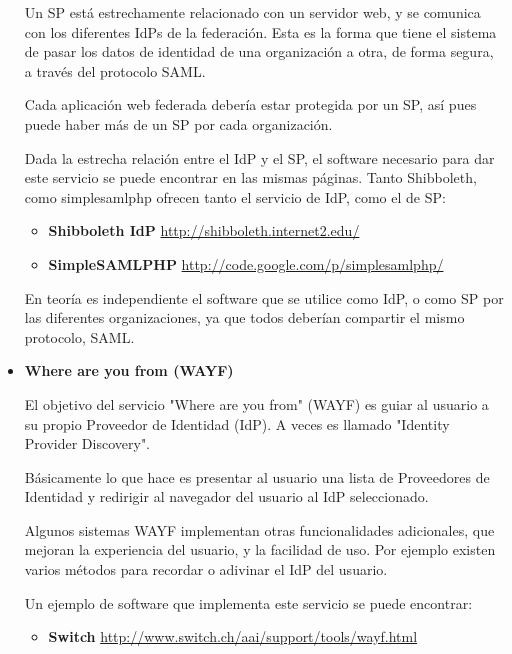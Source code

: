 \begin{itemize}
    Un SP está estrechamente relacionado con un servidor web, y se
    comunica con los diferentes IdPs de la federación. Esta es la
    forma que tiene el sistema de pasar los datos de identidad de una
    organización a otra, de forma segura, a través del protocolo SAML.

    Cada aplicación web federada debería estar protegida por un SP,
    así pues puede haber más de un SP por cada organización.

    Dada la estrecha relación entre el IdP y el SP, el software
    necesario para dar este servicio se puede encontrar en las mismas
    páginas. Tanto Shibboleth, como simplesamlphp ofrecen tanto el
    servicio de IdP, como el de SP:

    \begin{itemize}
        \item \textbf{Shibboleth IdP}
        \href{http://shibboleth.internet2.edu/}{http://shibboleth.internet2.edu/}
        \item \textbf{SimpleSAMLPHP}
        \href{http://code.google.com/p/simplesamlphp/}{http://code.google.com/p/simplesamlphp/}
    \end{itemize}

    En teoría es independiente el software que se utilice como IdP, o
    como SP por las diferentes organizaciones, ya que todos deberían
    compartir el mismo protocolo, SAML.

            \item \textbf{Where are you from (WAYF)}

    El objetivo del servicio "Where are you from" (WAYF) es guiar al
    usuario a su propio Proveedor de Identidad (IdP). A veces es
    llamado "Identity Provider Discovery".

    Básicamente lo que hace es presentar al usuario una lista de
    Proveedores de Identidad y redirigir al navegador del usuario al
    IdP seleccionado.

    Algunos sistemas WAYF implementan otras funcionalidades
    adicionales, que mejoran la experiencia del usuario, y la
    facilidad de uso. Por ejemplo existen varios métodos para recordar
    o adivinar el IdP del usuario.

    Un ejemplo de software que implementa este servicio se puede
    encontrar:
    
    \begin{itemize}
        \item \textbf{Switch}
        \href{http://www.switch.ch/aai/support/tools/wayf.html}{http://www.switch.ch/aai/support/tools/wayf.html}
    \end{itemize}


\end{itemize}
